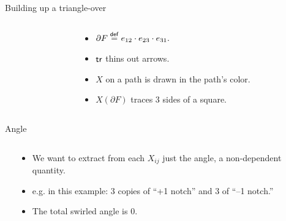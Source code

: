 \begin{frame}{Building up a triangle-over}
\end{frame}

\begin{frame}
\begin{columns}
\begin{column}{0.65\textwidth}
\vspace{12pt}
\begingroup
{}

\endgroup
\end{column}
\begin{column}{0.35\textwidth}
\begin{itemize}
\item \( \partial F\stackrel{\mathsf{def}}{=} e_{12}\cdot e_{23}\cdot e_{31}.  \)
\item \( \mathsf{tr} \) thins out arrows.
\item \( X \) on a path is drawn in the path's color.
\item \( X(\partial F) \) traces 3 sides of a square.
\end{itemize}
\end{column}
\end{columns}
\end{frame}

\begin{frame}{Angle}
\begin{columns}
\begin{column}{0.3\textwidth}

\end{column}
\begin{column}{0.7\textwidth}
\begin{itemize}
\item We want to extract from each \( X_{ij} \) just the \alert{angle}, a non-dependent quantity.
\item e.g. in this example: 3 copies of ``+1 notch'' and 3 of ``--1 notch.''
\item The total swirled angle is 0.
\end{itemize}
\end{column}
\end{columns}
\end{frame}

